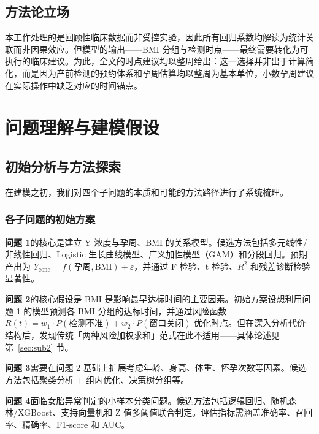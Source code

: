 \documentclass{mcm-paper}
\begin{document}
\subsection{方法论立场}

本工作处理的是回顾性临床数据而非受控实验，因此所有回归系数均解读为统计关联而非因果效应。但模型的输出——BMI 分组与检测时点——最终需要转化为可执行的临床建议。为此，全文的时点建议均以整周给出：这一选择并非出于计算简化，而是因为产前检测的预约体系和孕周估算均以整周为基本单位，小数孕周建议在实际操作中缺乏对应的时间锚点。

\newpage

\section{问题理解与建模假设}

\subsection{初始分析与方法探索}

在建模之初，我们对四个子问题的本质和可能的方法路径进行了系统梳理。

\subsubsection{各子问题的初始方案}

\textbf{问题 1}的核心是建立 Y 浓度与孕周、BMI 的关系模型。候选方法包括多元线性/非线性回归、Logistic 生长曲线模型、广义加性模型（GAM）和分段回归。预期产出为 $Y_{\text{conc}} = f(\text{孕周}, \text{BMI}) + \varepsilon$，并通过 F 检验、t 检验、$R^2$ 和残差诊断检验显著性。

\textbf{问题 2}的核心假设是 BMI 是影响最早达标时间的主要因素。初始方案设想利用问题 1 的模型预测各 BMI 分组的达标时间，并通过风险函数 $R(t) = w_1 \cdot P(\text{检测不准}) + w_2 \cdot P(\text{窗口关闭})$ 优化时点。但在深入分析代价结构后，发现传统「两种风险加权求和」范式在此不适用——具体论述见第~\ref{sec:sub2} 节。

\textbf{问题 3}需要在问题 2 基础上扩展考虑年龄、身高、体重、怀孕次数等因素。候选方法包括聚类分析 + 组内优化、决策树分组等。

\textbf{问题 4}面临女胎异常判定的小样本分类问题。候选方法包括逻辑回归、随机森林/XGBoost、支持向量机和 Z 值多阈值联合判定。评估指标需涵盖准确率、召回率、精确率、F1-score 和 AUC。
\end{document}
